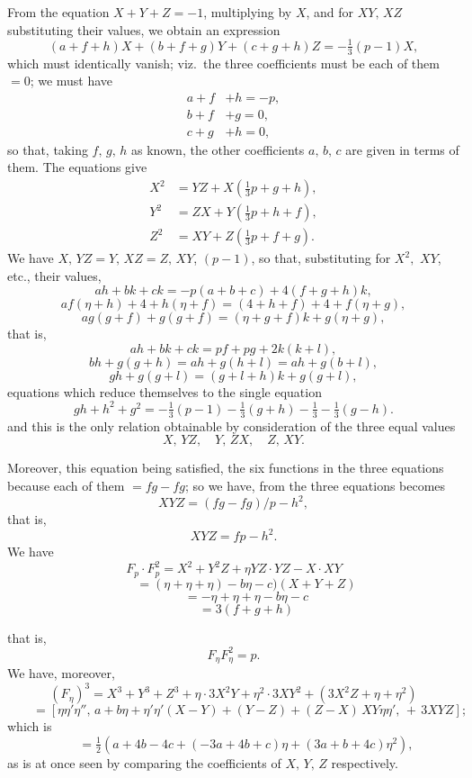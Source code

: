 \documentclass[11pt]{article}
\begin{document}
\medskip

\noindent
From the equation $X + Y + Z = -1$, multiplying by $X$, and for $XY,\,XZ$
substituting their values, we obtain an expression
\[
(a + f + h)X + (b + f + g)Y + (c + g + h)Z = -\tfrac{1}{3}(p - 1)X,
\]
which must identically vanish; viz.\ the three coefficients must be each of them $= 0$; we
must have
\begin{align*}
a + f &+ h = -p,\\
b + f &+ g = 0,\\
c + g &+ h = 0,
\end{align*}
so that, taking $f,\,g,\,h$ as known, the other coefficients $a,\,b,\,c$ are given in terms of them.
The equations give
\begin{align*}
X^2 &= YZ + X(\tfrac{1}{3}p + g + h),\\
Y^2 &= ZX + Y(\tfrac{1}{3}p + h + f),\\
Z^2 &= XY + Z(\tfrac{1}{3}p + f + g).
\end{align*}
We have $X,\,YZ = Y,\,XZ = Z,\,XY$, $(p - 1)$, so that, substituting for $X^2,$
$XY$, etc., their values,
\[
ah + bk + ck = -p(a + b + c) + 4(f + g + h)k,
\]
\[
af(\eta + h) + 4 + h(\eta + f) = (4 + h + f) + 4 + f(\eta + g),
\]
\[
ag(g + f) + g(g + f) = (\eta + g + f)k + g(\eta + g),
\]
that is,
\[
ah + bk + ck = pf + pg + 2k(k + l),
\]
\[
bh + g(g + h) = ah + g(h + l) = ah + g(b + l),
\]
\[
gh + g(g + l) = (g + l + h)k + g(g + l),
\]
equations which reduce themselves to the single equation
\[
gh + h^2 + g^2 = -\tfrac{1}{3}(p - 1) - \tfrac{1}{3}(g + h) - \tfrac{1}{3} - \tfrac{1}{3}(g - h).
\]
and this is the only relation obtainable by consideration of the three equal values
\[
X,\,YZ,\quad Y,\,ZX,\quad Z,\,XY.
\]

\medskip

\noindent
Moreover, this equation being satisfied, the six functions in the three equations because
each of them $=fg - fg$; so we have, from the three equations becomes
\[
XYZ = (fg - fg)/p - h^2,
\]
that is,
\[
XYZ = fp - h^2.
\]
We have
\[
F_p \cdot F_p^2 = X^2 + Y^2Z + \eta YZ \cdot YZ - X \cdot XY
\]
\[
\qquad = (\eta + \eta + \eta) - b\eta - c)(X + Y + Z)
\]
\[
\qquad = -\eta + \eta + \eta - b\eta - c
\]
\[
\qquad = 3(f + g + h)
\]

\newpage

\noindent
that is,
\[
F_\eta F_\eta^2 = p.
\]
\noindent
We have, moreover,
\[
(F_\eta)^3 = X^3 + Y^3 + Z^3 + \eta \cdot 3X^2 Y + \eta^2 \cdot 3X Y^2 + (3 X^2 Z + \eta + \eta^2)
\]
\[
\qquad = [\eta\eta'\eta'',\, a + b\eta + \eta'\eta'(X - Y) + (Y - Z) + (Z - X)\,XY\eta\eta',\, +\,3XYZ];
\]
which is
\[
\qquad = \tfrac{1}{2}(a + 4b - 4c + (-3a + 4b + c)\eta + (3a + b + 4c)\eta^2),
\]
as is at once seen by comparing the coefficients of $X,\,Y,\,Z$ respectively.
\end{document}
